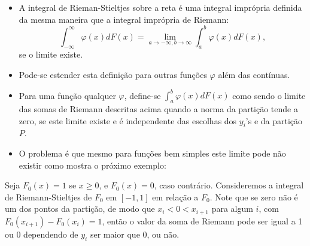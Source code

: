 \begin{frame}
\begin{block}{}
	\begin{itemize}
%
\item A integral de Rieman-Stieltjes sobre a reta é uma integral imprópria definida da mesma maneira que a integral imprópria de Riemann:
$$\int_{-\infty}^{\infty}\varphi(x)dF(x)=\lim_{a\rightarrow-\infty,b\rightarrow\infty}\int_{a}^{b}\varphi(x)dF(x),$$
se o limite existe.

\item Pode-se estender esta definição para outras funções $\varphi$ além das contínuas. 

\item Para uma função qualquer $\varphi$, define-se $\int_{a}^{b}\varphi(x)dF(x)$ como sendo o limite das somas de Riemann descritas acima quando a norma da partição tende a zero, se este limite existe e é independente das escolhas dos $y_i$'s e da partição $P$. 

\item O problema é que mesmo para funções bem simples este limite pode não existir como mostra o próximo exemplo:
\end{itemize}
\end{block}
\begin{exem}
	Seja $F_0(x)=1$ se $x\geq 0$, e $F_0(x)=0$, caso contrário. Consideremos a integral de Riemann-Stieltjes de $F_0$ em $[-1,1]$ em relação a $F_0$. Note que se zero não é um dos pontos da partição, de modo que $x_i<0<x_{i+1}$ para algum $i$, com $F_0(x_{i+1})-F_0(x_i)=1$, então o valor da soma de Riemann pode ser igual a 1 ou 0 dependendo de $y_i$ ser maior que 0, ou não.
\end{exem}
\end{frame}
%
